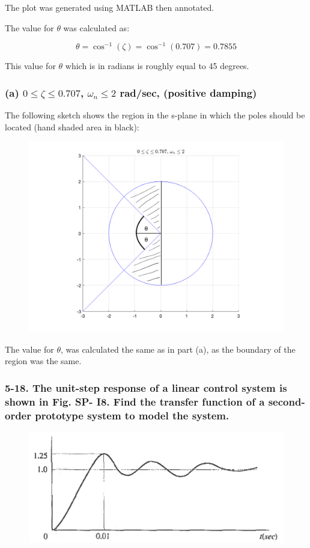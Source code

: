 \documentclass[12pt, letterpaper]{../assignment}
\begin{document}
The plot was generated using MATLAB then annotated.

The value for $\theta$ was calculated as:

$$ \theta = \cos^{-1}(\zeta) = \cos^{-1}(0.707) = 0.7855 $$

This value for $\theta$ which is in radians is roughly equal to 45 degrees.

\subsubsection*{(a) $0 \le \zeta \le 0.707 $, $\omega_n \le 2$ rad/sec, (positive damping)}

The following sketch shows the region in the s-plane in which the poles should be located (hand shaded area in black):

\begin{figure}[H]
    \centering
    \includegraphics[width=0.7\linewidth]{./figures/problem_5_1_b.png}
    \label{fig:step}
\end{figure}

The value for $\theta$, was calculated the same as in part (a),
as the boundary of the region was the same.

\subsubsection*{5-18. The unit-step response of a linear control system is shown in Fig. SP- I8. Find the transfer
function of a second-order prototype system to model the system.}

\begin{figure}[H]
    \centering
    \includegraphics[width=0.7\linewidth]{./figures/problem_5_18.png}
    \label{fig:step}
\end{figure}
\end{document}
